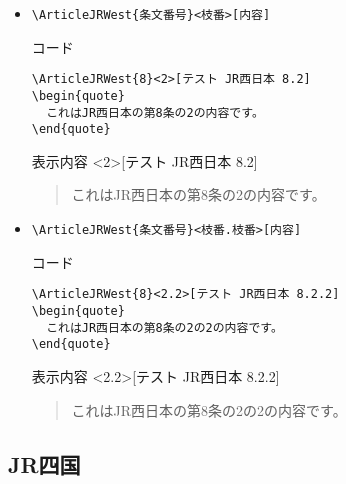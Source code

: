 \documentclass[oneside,10pt,a4paper]{jsarticle}
\begin{document}
\begin{itemize}
    \item \verb|\ArticleJRWest{条文番号}<枝番>[内容]|
      \begin{itembox}[l]{コード}
        {\footnotesize\begin{verbatim}
\ArticleJRWest{8}<2>[テスト JR西日本 8.2]
\begin{quote}
  これはJR西日本の第8条の2の内容です。
\end{quote}\end{verbatim}}
      \end{itembox}
      \begin{itembox}[l]{表示内容}
        <2>[テスト JR西日本 8.2]
        \begin{quote}
          これはJR西日本の第8条の2の内容です。
        \end{quote}
      \end{itembox}
    \item \verb|\ArticleJRWest{条文番号}<枝番.枝番>[内容]|
      \begin{itembox}[l]{コード}
        {\footnotesize\begin{verbatim}
\ArticleJRWest{8}<2.2>[テスト JR西日本 8.2.2]
\begin{quote}
  これはJR西日本の第8条の2の2の内容です。
\end{quote}\end{verbatim}}
      \end{itembox}
      \begin{itembox}[l]{表示内容}
        <2.2>[テスト JR西日本 8.2.2]
        \begin{quote}
          これはJR西日本の第8条の2の2の内容です。
        \end{quote}
      \end{itembox}
  \end{itemize}

  \newpage

  \subsection{JR四国}
\end{document}
